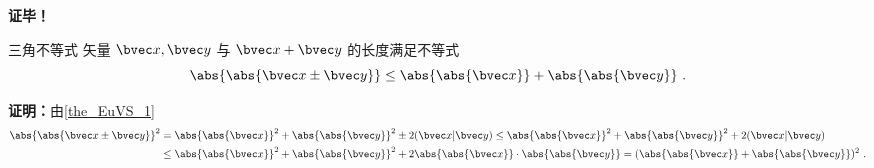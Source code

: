 \textbf{证毕！}
\begin{corollary}{三角不等式}\label{cor_EuVS_1}
矢量 $\bvec x,\bvec y$ 与 $\bvec x+\bvec y$ 的长度满足不等式
\begin{equation}
\abs{\abs{\bvec x\pm\bvec y}}\leq\abs{\abs{\bvec x}}+\abs{\abs{\bvec y}}~.
\end{equation}
\end{corollary}
\textbf{证明：}由\autoref{the_EuVS_1} 
\begin{equation}
\begin{aligned}
\abs{\abs{\bvec x\pm\bvec y}}^2&=\abs{\abs{\bvec x}}^2+\abs{\abs{\bvec y}}^2\pm2(\bvec x|\bvec y)\leq\abs{\abs{\bvec x}}^2+\abs{\abs{\bvec y}}^2+2(\bvec x|\bvec y)\\
&\leq \abs{\abs{\bvec x}}^2+\abs{\abs{\bvec y}}^2+2\abs{\abs{\bvec x}}\cdot\abs{\abs{\bvec y}}=(\abs{\abs{\bvec x}}+\abs{\abs{\bvec y}})^2~.
\end{aligned}
\end{equation}

